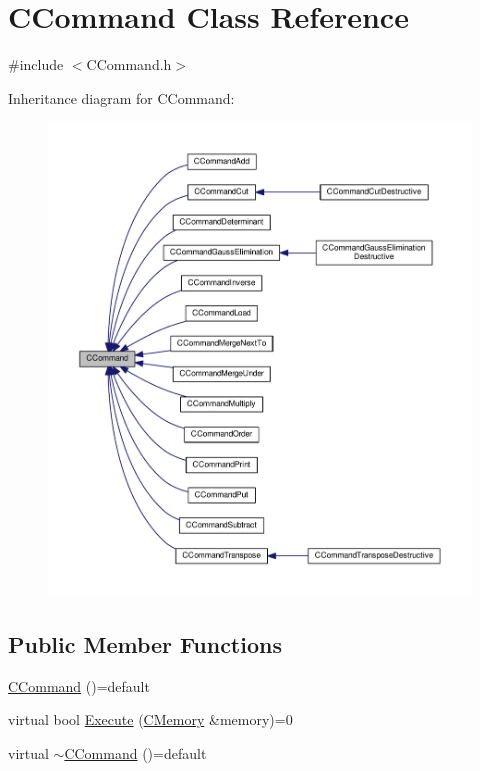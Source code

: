 \hypertarget{classCCommand}{}\section{C\+Command Class Reference}
\label{classCCommand}


{\ttfamily \#include $<$C\+Command.\+h$>$}



Inheritance diagram for C\+Command\+:
\nopagebreak
\begin{figure}[H]
\begin{center}
\leavevmode
\includegraphics[width=350pt]{classCCommand__inherit__graph}
\end{center}
\end{figure}
\subsection*{Public Member Functions}
\begin{DoxyCompactItemize}
\item 
\hyperlink{classCCommand_af50175d5481d07679cf015fedff6afa7}{C\+Command} ()=default
\item 
virtual bool \hyperlink{classCCommand_ad9361ea814093c4ebecf22bb0a3f8b79}{Execute} (\hyperlink{classCMemory}{C\+Memory} \&memory)=0
\item 
virtual \hyperlink{classCCommand_a8b2c385d38a996872c963fcff08b3809}{$\sim$\+C\+Command} ()=default
\end{DoxyCompactItemize}

